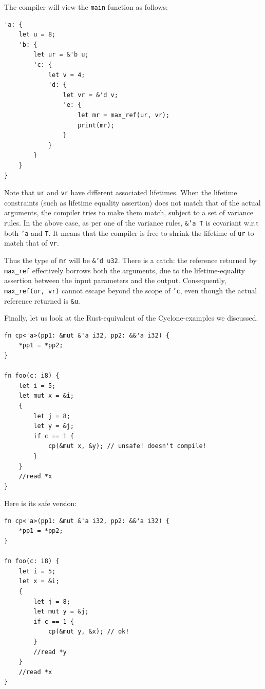 \documentclass[11pt]{report}
\begin{document}
The compiler will view the \texttt{main} function as follows:

\begin{lstlisting}
'a: {
    let u = 8;
    'b: {
        let ur = &'b u;
        'c: {
            let v = 4;
            'd: {
                let vr = &'d v;
                'e: {
                    let mr = max_ref(ur, vr);
                    print(mr);
                }
            }
        }
    }
}
\end{lstlisting}

Note that \texttt{ur} and \texttt{vr} have different associated lifetimes. When the lifetime constraints (such as lifetime equality assertion) does not match that of the actual arguments, the compiler tries to make them match, subject to a set of variance rules. In the above case, as per one of the variance rules, \texttt{\&'a T} is covariant w.r.t both \texttt{'a} and \texttt{T}. It means that the compiler is free to shrink the lifetime of \texttt{ur} to match that of \texttt{vr}.

Thus the type of \texttt{mr} will be \texttt{\&'d u32}. There is a catch: the reference returned by \texttt{max\_ref} effectively borrows both the arguments, due to the lifetime-equality assertion between the input parameters and the output. Consequently, \texttt{max\_ref(ur, vr)} cannot escape beyond the scope of \texttt{'c}, even though the actual reference returned is \texttt{\&u}.

Finally, let us look at the Rust-equivalent of the Cyclone-examples we discussed.

\begin{lstlisting}
fn cp<'a>(pp1: &mut &'a i32, pp2: &&'a i32) {
    *pp1 = *pp2;
}

fn foo(c: i8) {
    let i = 5;
    let mut x = &i;
    {
        let j = 8;
        let y = &j;
        if c == 1 {
            cp(&mut x, &y); // unsafe! doesn't compile!
        }
    }
    //read *x
}
\end{lstlisting}

\noindent Here is its safe version:

\begin{lstlisting}
fn cp<'a>(pp1: &mut &'a i32, pp2: &&'a i32) {
    *pp1 = *pp2;
}

fn foo(c: i8) {
    let i = 5;
    let x = &i;
    {
        let j = 8;
        let mut y = &j;
        if c == 1 {
            cp(&mut y, &x); // ok!
        }
        //read *y
    }
    //read *x
}
\end{lstlisting}
\end{document}
